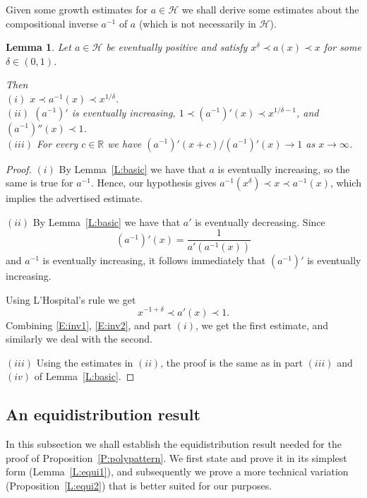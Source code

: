 \documentclass[11pt]{amsart}
\renewcommand{\H}{\mathcal{H}}
\newcommand{\R}{\mathbb{R}}
\theoremstyle{plain}
\newtheorem{lemma}[theorem]{Lemma}
\theoremstyle{definition}
\theoremstyle{remark}
\begin{document}
Given some growth estimates for $a\in \H$ we shall derive some
estimates about the compositional inverse $a^{-1}$ of $a$ (which is
not necessarily in $\H$).
\begin{lemma}\label{L:basic'}
  Let $a\in \H$ be eventually positive and satisfy $x^{\delta} \prec
  a(x)\prec x$ for some $\delta\in (0,1)$.

  Then  \\
  $(i)$ $x\prec a^{-1}(x)\prec x^{1/\delta}$.\\
  $(ii)$  $(a^{-1})'$  is eventually increasing,  $1\prec (a^{-1})'(x)\prec x^{1/\delta-1}$, and $(a^{-1})''(x)\prec 1$.\\
  $(iii)$ For every $c\in\R$ we have $(a^{-1})'(x+c)/(a^{-1})'(x)\to
  1$ as $x\to\infty$.
\end{lemma}
\begin{proof}
  $(i)$ By Lemma~\ref{L:basic} we have that $a$ is eventually
  increasing, so the same is true for $a^{-1}$.  Hence,  our hypothesis
  gives $a^{-1}(x^{\delta}) \prec x\prec a^{-1}(x)$, which implies the
  advertised estimate.

  $(ii)$ By Lemma~\ref{L:basic} we have that $a'$ is eventually
  decreasing.  Since
  \begin{equation}\label{E:inv1}
    (a^{-1})'(x)=\frac{1}{a'(a^{-1}(x))}
  \end{equation}
  and $a^{-1}$ is eventually increasing, it follows immediately that
  $(a^{-1})'$ is eventually increasing.

  Using L'Hospital's rule we get
  \begin{equation}\label{E:inv2}
    x^{-1+\delta} \prec a'(x)\prec 1.
  \end{equation}
  Combining \eqref{E:inv1}, \eqref{E:inv2}, and part $(i)$, we get the
  first estimate, and similarly we deal with the second.



  $(iii)$ Using the estimates in $(ii)$, the proof is the same as in
  part $(iii)$ and $(iv)$ of Lemma~\ref{L:basic}.
\end{proof}

\subsection{An equidistribution result}
In this subsection we shall establish the equidistribution result
needed for the proof of Proposition~\ref{P:polypattern}.  We first
state and prove it in its simplest form (Lemma~\ref{L:equi1}), and subsequently we prove a
more technical variation (Proposition~\ref{L:equi2}) that is better
suited for our purposes.
\end{document}
